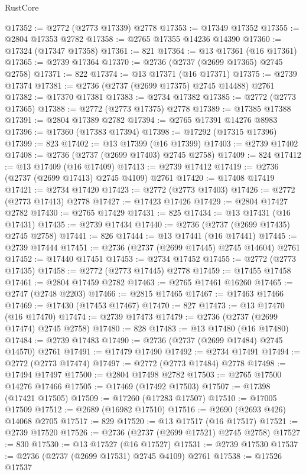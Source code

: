 \begin{lexlean}{RustCore}
\begin{coremodule}
@17352 := @2772 (@2773 @17339) @2778
@17353 := @17349 @17352
@17355 := @2804 @17353 @2782
@17358 := @2765 @17355 @14236 @14390
@17360 := @17324 (@17347 @17358)
@17361 := 821
@17364 := @13 @17361 (@16 @17361)
@17365 := @2739 @17364
@17370 := @2736 (@2737 (@2699 @17365) @2745 @2758)
@17371 := 822
@17374 := @13 @17371 (@16 @17371)
@17375 := @2739 @17374
@17381 := @2736 (@2737 (@2699 @17375) @2745 @14488) @2761
@17382 := @17370 @17381
@17383 := @2734 @17382
@17385 := @2772 (@2773 @17365)
@17388 := @2772 (@2773 @17375) @2778
@17389 := @17385 @17388
@17391 := @2804 @17389 @2782
@17394 := @2765 @17391 @14276 @8983
@17396 := @17360 (@17383 @17394)
@17398 := @17292 (@17315 @17396)
@17399 := 823
@17402 := @13 @17399 (@16 @17399)
@17403 := @2739 @17402
@17408 := @2736 (@2737 (@2699 @17403) @2745 @2758)
@17409 := 824
@17412 := @13 @17409 (@16 @17409)
@17413 := @2739 @17412
@17419 := @2736 (@2737 (@2699 @17413) @2745 @4109) @2761
@17420 := @17408 @17419
@17421 := @2734 @17420
@17423 := @2772 (@2773 @17403)
@17426 := @2772 (@2773 @17413) @2778
@17427 := @17423 @17426
@17429 := @2804 @17427 @2782
@17430 := @2765 @17429
@17431 := 825
@17434 := @13 @17431 (@16 @17431)
@17435 := @2739 @17434
@17440 := @2736 (@2737 (@2699 @17435) @2745 @2758)
@17441 := 826
@17444 := @13 @17441 (@16 @17441)
@17445 := @2739 @17444
@17451 := @2736 (@2737 (@2699 @17445) @2745 @14604) @2761
@17452 := @17440 @17451
@17453 := @2734 @17452
@17455 := @2772 (@2773 @17435)
@17458 := @2772 (@2773 @17445) @2778
@17459 := @17455 @17458
@17461 := @2804 @17459 @2782
@17463 := @2765 @17461 @16260
@17465 := @2747 (@2748 @2203)
@17466 := @2815 @17465
@17467 := @17463 @17466
@17469 := @17430 (@17453 @17467)
@17470 := 827
@17473 := @13 @17470 (@16 @17470)
@17474 := @2739 @17473
@17479 := @2736 (@2737 (@2699 @17474) @2745 @2758)
@17480 := 828
@17483 := @13 @17480 (@16 @17480)
@17484 := @2739 @17483
@17490 := @2736 (@2737 (@2699 @17484) @2745 @14570) @2761
@17491 := @17479 @17490
@17492 := @2734 @17491
@17494 := @2772 (@2773 @17474)
@17497 := @2772 (@2773 @17484) @2778
@17498 := @17494 @17497
@17500 := @2804 @17498 @2782
@17503 := @2765 @17500 @14276 @17466
@17505 := @17469 (@17492 @17503)
@17507 := @17398 (@17421 @17505)
@17509 := @17260 (@17283 @17507)
@17510 := @17005 @17509
@17512 := @2689 (@16982 @17510)
@17516 := @2690 (@2693 @426) @14068 @2705
@17517 := 829
@17520 := @13 @17517 (@16 @17517)
@17521 := @2739 @17520
@17526 := @2736 (@2737 (@2699 @17521) @2745 @2758)
@17527 := 830
@17530 := @13 @17527 (@16 @17527)
@17531 := @2739 @17530
@17537 := @2736 (@2737 (@2699 @17531) @2745 @4109) @2761
@17538 := @17526 @17537

\end{coremodule}
\end{lexlean}
